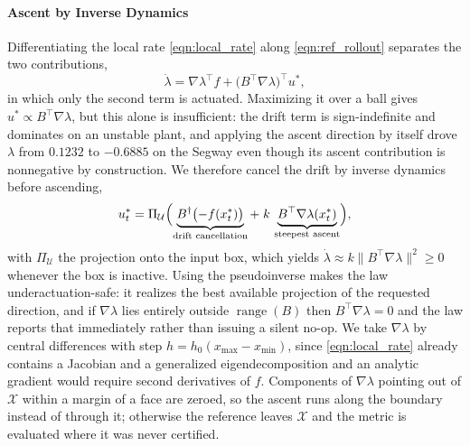 \documentclass[lettersize,journal]{IEEEtran}
\begin{document}
\paragraph{Ascent by Inverse Dynamics}
Differentiating the local rate \eqref{eqn:local_rate} along
\eqref{eqn:ref_rollout} separates the two contributions,
\begin{equation}\label{eqn:lambda_dot}
    \dot\lambda = \nabla\lambda^\top f + \bigl(B^\top\nabla\lambda\bigr)^\top u^*,
\end{equation}
in which only the second term is actuated. Maximizing it over a ball gives
$u^*\propto B^\top\nabla\lambda$, but this alone is insufficient: the drift term
is sign-indefinite and dominates on an unstable plant, and applying the ascent
direction by itself drove $\lambda$ from $0.1232$ to $-0.6885$ on the Segway
even though its ascent contribution is nonnegative by construction. We
therefore cancel the drift by inverse dynamics before ascending,
\begin{equation}\label{eqn:migrate_law}
    u^*_t = \Pi_{\mathcal{U}}\Bigl(\underbrace{B^\dagger\bigl(-f(x^*_t)\bigr)}_{\text{drift cancellation}}
    + \; k\,\underbrace{B^\top\nabla\lambda(x^*_t)}_{\text{steepest ascent}}\Bigr),
\end{equation}
with $\Pi_{\mathcal{U}}$ the projection onto the input box, which yields
$\dot\lambda\approx k\lVert B^\top\nabla\lambda\rVert^2\ge0$ whenever the box is
inactive. Using the pseudoinverse makes the law underactuation-safe: it realizes
the best available projection of the requested direction, and if $\nabla\lambda$
lies entirely outside $\operatorname{range}(B)$ then $B^\top\nabla\lambda=0$ and
the law reports that immediately rather than issuing a silent no-op. We take
$\nabla\lambda$ by central differences with step $h=h_0(x_{\max}-x_{\min})$,
since \eqref{eqn:local_rate} already contains a Jacobian and a generalized
eigendecomposition and an analytic gradient would require second derivatives of
$f$. Components of $\nabla\lambda$ pointing out of $\mathcal{X}$ within a margin
of a face are zeroed, so the ascent runs along the boundary instead of through
it; otherwise the reference leaves $\mathcal{X}$ and the metric is evaluated
where it was never certified.
\end{document}
